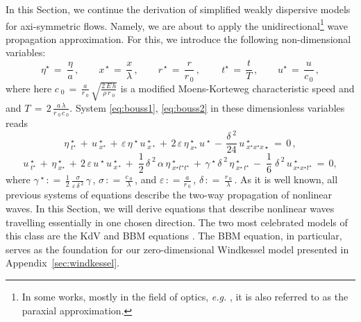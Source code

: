 \documentclass[alpha-refs, 12pt]{wiley-article}
\newcommand{\eps}{\varepsilon}
\newcommand{\eqdef}{\mathrel{\mathop:}=}
\begin{document}
In this Section, we continue the derivation of simplified weakly dispersive models for axi-symmetric flows. Namely, we are about to apply the unidirectional\footnote{In some works, mostly in the field of optics, \emph{e.g.} \cite{Agrawal1979}, it is also referred to as the paraxial approximation.} wave propagation approximation. For this, we introduce the following non-dimensional variables:
\begin{equation*}
   \eta^{\star}\,=\;\frac{\eta}{a}\,, \qquad x^{\,\star}\,=\,\frac{x}{\lambda}\,, \qquad r^{\,\star}\,=\,\frac{r}{r_{\,0}}\,,\,\qquad t^{\star}\,=\,\frac{t}{T}\,,\qquad u^{\star}\,=\,\frac{u}{c_{\,0}}\,,
\end{equation*}
where here $c_{\;0}\,=\,\displaystyle\frac{a}{r_{\;0}}\,\sqrt{\frac{2\,E\,h}{ \rho\,r_{\;0}}}$ is a modified Moens-Korteweg characteristic speed and and $T\,=\,2\,\displaystyle\frac{a\,\lambda}{r_{\;0}\,c_{\;0}}$. System \eqref{eq:bouss1}, \eqref{eq:bouss2} in these dimensionless variables reads
\begin{equation}\label{eq:bouss1d}
  \eta^{\;\star}_{\;t^{\star}}\,+\,u^{\;\star}_{\;x^{\star}} \,+\, \eps\,\eta^{\;\star}\,u^{\;\star}_{\;x^{\;\star}}\,+\,2\,\eps\,\eta^{\;\star}_{\;x^{\star}}\,u^{\;\star}\,-\,\frac{\delta^{\;2}}{24}\,u^{\;\star}_{\;x^{\star}x^{ \star}x{\star}}\,=\,0\,,
\end{equation}
\begin{equation}\label{eq:bouss2d}
  u^{\;\star}_{\;t^{\star}}\, + \,\eta^{\;\star}_{\;x^{\star}}\, + \,2\,\eps\,u^{\;\star}\,u^{\;\star}_{\;x^{\,\star}}\, + \;\frac{1}{2}\,\delta^{\;2}\,\alpha\,\eta^{\;\star}_{\;x^{\star}t^{\star}t^{\star}}\, + \,\gamma^{\;\star}\,\delta^{\;2}\,\eta^{\;\star}_{\;x^{\star}\,t^{\star}}\, - \;\frac{1}{6}\;\delta^{\;2}\,u^{\;\star}_{\,x^{\star}x^{\star}t^{\star}}\,=\,0,
\end{equation}
where $\gamma^{\;\star}\,\eqdef\,\displaystyle\frac{1}{2}\,\frac{\sigma}{\eps\,\delta^{\;2}}\,\gamma\,$, $\sigma\,\eqdef\,\frac{c_{\;0}}{\lambda}\,$,  and $\eps\,\eqdef\frac{a}{r_{\;0}}\,$, $\delta\,\eqdef\,\frac{r_{\;0}}{\lambda}\,$. As it is well known, all previous systems of equations describe the two-way propagation of nonlinear waves. In this Section, we will derive equations that describe nonlinear waves travelling essentially in one chosen direction. The two most celebrated models of this class are the KdV and BBM equations \cite{KdV, bona, Bona1975a, Zabusky1971, Dutykh2013a, Dutykh2014d, Dutykh2014a}. The BBM equation, in particular, serves as the foundation for our zero-dimensional Windkessel model presented in Appendix~\ref{sec:windkessel}.
\end{document}
